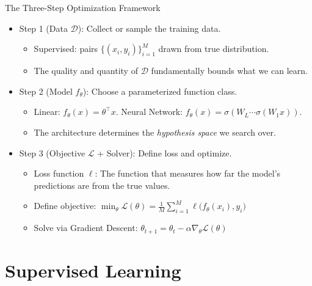 \documentclass[aspectratio=169]{beamer}
\newcommand{\1}{\mathbf{1}}
\newcommand{\loss}{\mathcal{L}}
\newcommand{\D}{\mathcal{D}}
\begin{document}
\begin{frame}{The Three-Step Optimization Framework}
    \small
    \vspace{0.3mm}

    \begin{itemize}
        \item Step 1 (Data $\D$): Collect or sample the training data.
        \begin{itemize}
            \item Supervised: pairs $\{(x_i, y_i)\}_{i=1}^M$ drawn from true distribution.
            \item The quality and quantity of $\D$ fundamentally bounds what we can learn.
        \end{itemize}
        
        \item Step 2 (Model $f_\theta$): Choose a parameterized function class.
        \begin{itemize}
            \item Linear: $f_\theta(x) = \theta^\top x$. \quad Neural Network: $f_\theta(x) = \sigma(W_L \cdots \sigma(W_1 x))$.
            \item The architecture determines the \textit{hypothesis space} we search over.
        \end{itemize}

        \item Step 3 (Objective $\loss$ + Solver): Define loss and optimize.
        \begin{itemize}
            \item Loss function $\ell$: The function that measures how far the model's predictions are from the true values.
            \item Define objective: $\displaystyle \min_{\theta} \loss(\theta) = \frac{1}{M} \sum_{i=1}^M \ell\big(f_\theta(x_i), y_i\big)$
            \item Solve via Gradient Descent: $\theta_{t+1} = \theta_t - \alpha \nabla_\theta \loss(\theta)$
        \end{itemize}
    \end{itemize}
    \end{frame}





\section{Supervised Learning}
\end{document}
